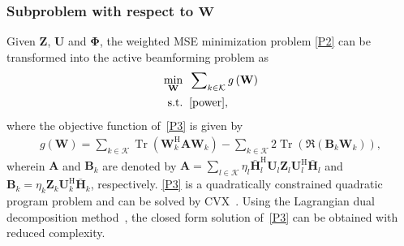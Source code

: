 \documentclass[12pt, draftclsnofoot, onecolumn]{IEEEtran}
\DeclareMathOperator{\tr}{Tr}
\begin{document}
\subsubsection{Subproblem with respect to $\mathbf{W}$}
Given $\mathbf{Z}$, $\mathbf{U}$ and $\mathbf{\Phi}$, the weighted MSE  minimization problem \eqref{P2} can be transformed into the active beamforming problem as
\begin{subequations}\label{P3}
\begin{align}
\mathop {\min }\limits_{ {{\mathbf{W}}} } \;\;&\sum\nolimits_{k\in\mathcal{K}}g\left(\mathbf{W}\right)\\
{\rm{s.t.}}\;\;& \eqref{power},
\end{align}
\end{subequations}
where the objective function of~\eqref{P3} is given by 
\begin{equation}
\begin{aligned}
g\left(\mathbf{W}\right)=\sum\nolimits_{k\in\mathcal{K}}\tr\left(\mathbf{W}_k^\mathrm{H}\mathbf{A}\mathbf{W}_k\right)-\sum\nolimits_{k\in\mathcal{K}}2\tr\left(\Re\left(\mathbf{B}_k\mathbf{W}_k\right)\right),
\end{aligned}
\end{equation}
wherein $\mathbf{A}$ and $\mathbf{B}_k$ are denoted by $\mathbf{A}=\sum\nolimits_{l\in\mathcal{K}}\eta_l\bar{\mathbf{H}}_l^\mathrm{H}\mathbf{U}_l\mathbf{Z}_l\mathbf{U}_l^\mathrm{H}\bar{\mathbf{H}}_l$ and $\mathbf{B}_k=\eta_k\mathbf{Z}_k\mathbf{U}_k^\mathrm{H}\bar{\mathbf{H}}_k$, respectively. \eqref{P3} is a quadratically constrained quadratic program problem and can be solved by CVX~\cite{grant2014cvx}. {Using the Lagrangian dual decomposition method~\cite{pan2020multicell}, the closed form solution of~\eqref{P3} can be obtained with reduced complexity.}
\end{document}
